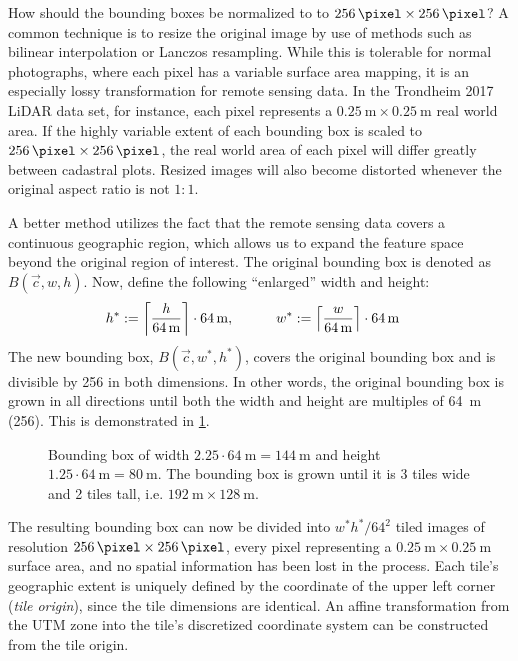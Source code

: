 How should the bounding boxes be normalized to to $\SI{256}{\pixel} \times \SI{256}{\pixel}$?
A common technique is to resize the original image by use of methods such as bilinear interpolation or Lanczos resampling.
While this is tolerable for normal photographs, where each pixel has a variable surface area mapping, it is an especially lossy transformation for remote sensing data.
In the Trondheim 2017 LiDAR data set, for instance, each pixel represents a $\SI{0.25}{\meter} \times \SI{0.25}{\meter}$ real world area.
If the highly variable extent of each bounding box is scaled to $\SI{256}{\pixel} \times \SI{256}{\pixel}$, the real world area of each pixel will differ greatly between cadastral plots.
Resized images will also become distorted whenever the original aspect ratio is not $1:1$.

A better method utilizes the fact that the remote sensing data covers a continuous geographic region, which allows us to expand the feature space beyond the original region of interest.
The original bounding box is denoted as $B(\vec{c}, w, h)$.
Now, define the following \enquote{enlarged} width and height:
%
\begin{align*}
  h^* &:= \left\lceil \frac{h}{\SI{64}{\meter}} \right\rceil \cdot \SI{64}{\meter},
  \hspace{3em}
  w^* := \left\lceil \frac{w}{\SI{64}{\meter}} \right\rceil \cdot \SI{64}{\meter}
\end{align*}
%
The new bounding box, $B(\vec{c}, w^*, h^*)$, covers the original bounding box and is divisible by \SI{256}{\pixel} in both dimensions.
In other words, the original bounding box is grown in all directions until both the width and height are multiples of \SI{64}{\meter} (\SI{256}{\pixel}).
This is demonstrated in \cref{fig:bbox-growing}.

\begin{figure}[H]
  \centering
  
  \caption[Illustration of bounding box growing.]{%
    Bounding box of width $2.25 \cdot \SI{64}{\meter} = \SI{144}{\meter}$ and height $1.25 \cdot \SI{64}{\meter} = \SI{80}{\meter}$.
    The bounding box is grown until it is 3 tiles wide and 2 tiles tall, i.e. $\SI{192}{\meter} \times \SI{128}{\meter}$.
  }%
  \label{fig:bbox-growing}
\end{figure}

The resulting bounding box can now be divided into $w^*h^* / 64^2$ tiled images of resolution $\SI{256}{\pixel} \times \SI{256}{\pixel}$, every pixel representing a $\SI{0.25}{\meter} \times \SI{0.25}{\meter}$ surface area, and no spatial information has been lost in the process.
Each tile's geographic extent is uniquely defined by the coordinate of the upper left corner (\textit{tile origin}), since the tile dimensions are identical.
An affine transformation from the UTM zone into the tile's discretized coordinate system can be constructed from the tile origin.


